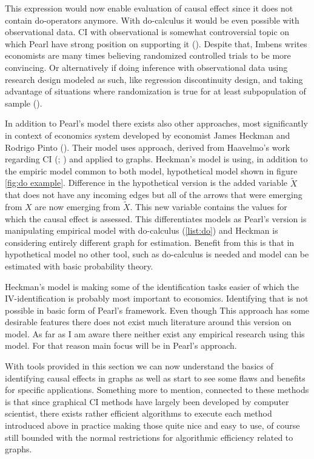 \documentclass[main=english,12pt,a4paper,pdftex,econ,utf8]{aaltothesis}
\begin{document}
This expression would now enable evaluation of causal effect since it does not contain do-operators anymore. With do-calculus it would be even possible with observational data. CI with observational is somewhat controversial topic on which Pearl have strong position on supporting it (\cite{Pearl2018}). Despite that, Imbens writes economists are many times believing randomized controlled trials to be more convincing. Or alternatively if doing inference with observational data using research design modeled as such, like regression discontinuity design, and taking advantage of situations where randomization is true for at least subpopulation of sample (\cite{imbes2020}).


In addition to Pearl's model there exists also other approaches, most significantly in context of economics system developed by economist James Heckman and Rodrigo Pinto (\cite{Heckman2015}). Their model uses approach, derived from Haavelmo's work regarding CI (\cite{Haavelmo1943}; \cite{Haavelmo1944}) and applied to graphs. Heckman's model is using, in addition to the empiric model common to both model, hypothetical model shown in figure \ref{fig:do example}. Difference in the hypothetical version is the added variable $\tilde X$ that does not have any incoming edges but all of the arrows that were emerging from $X$ are now emerging from $\tilde X$. This new variable contains the values for which the causal effect is assessed. This differentiates models as Pearl's version is manipulating empirical model with do-calculus (\ref{list:do}) and Heckman is considering entirely different graph for estimation. Benefit from this is that in hypothetical model no other tool, such as do-calculus is needed and model can be estimated with basic probability theory.

Heckman's model is making some of the identification tasks easier of which the IV-identification is probably most important to economics. Identifying that is not possible in basic form of Pearl's framework. Even though This approach has some desirable features there does not exist much literature around this version on model. As far as I am aware there neither exist any empirical research using this model. For that reason main focus will be in Pearl's approach.

With tools provided in this section we can now understand the basics of identifying causal effects in graphs as well as start to see some flaws and benefits for specific applications. Something more to mention, connected to these methods is that since graphical CI methods have largely been developed by computer scientist, there exists rather efficient algorithms to execute each method introduced above in practice making those quite nice and easy to use, of course still bounded with the normal restrictions for algorithmic efficiency related to graphs.
\end{document}
